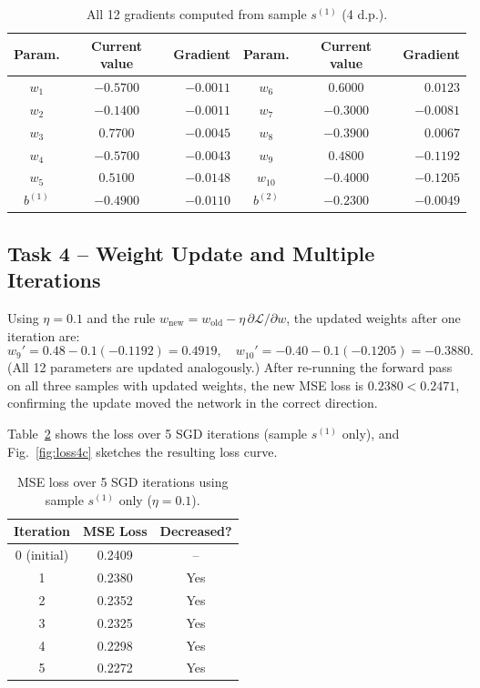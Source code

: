 \documentclass[runningheads]{llncs}
\begin{document}
\begin{table}[h]
\centering
\caption{All 12 gradients computed from sample $s^{(1)}$ (4 d.p.).}
\label{tab:gradients}
\begin{tabular}{ccr|ccr}
\toprule
Param. & Current value & Gradient & Param. & Current value & Gradient\\
\midrule
$w_1$      & $-0.5700$ & $-0.0011$ & $w_6$      & $0.6000$ & $0.0123$\\
$w_2$      & $-0.1400$ & $-0.0011$ & $w_7$      & $-0.3000$ & $-0.0081$\\
$w_3$      & $0.7700$  & $-0.0045$ & $w_8$      & $-0.3900$ & $0.0067$\\
$w_4$      & $-0.5700$ & $-0.0043$ & $w_9$      & $0.4800$ & $-0.1192$\\
$w_5$      & $0.5100$  & $-0.0148$ & $w_{10}$   & $-0.4000$ & $-0.1205$\\
$b^{(1)}$  & $-0.4900$ & $-0.0110$ & $b^{(2)}$  & $-0.2300$ & $-0.0049$\\
\bottomrule
\end{tabular}
\end{table}

\subsection{Task 4 -- Weight Update and Multiple Iterations}

Using $\eta = 0.1$ and the rule $w_{\text{new}} = w_{\text{old}} - \eta\,\partial\mathcal{L}/\partial w$, the updated weights after one iteration are:
\[
  w_9' = 0.48 - 0.1(-0.1192) = 0.4919, \quad
  w_{10}' = -0.40 - 0.1(-0.1205) = -0.3880.
\]
(All 12 parameters are updated analogously.) After re-running the forward pass
on all three samples with updated weights, the new MSE loss is $0.2380 < 0.2471$,
confirming the update moved the network in the correct direction.

Table~\ref{tab:task4c} shows the loss over 5 SGD iterations (sample $s^{(1)}$
only), and Fig.~\ref{fig:loss4c} sketches the resulting loss curve.

\begin{table}[h]
\centering
\caption{MSE loss over 5 SGD iterations using sample $s^{(1)}$ only ($\eta=0.1$).}
\label{tab:task4c}
\begin{tabular}{ccc}
\toprule
Iteration & MSE Loss & Decreased?\\
\midrule
0 (initial) & 0.2409 & --\\
1 & 0.2380 & Yes\\
2 & 0.2352 & Yes\\
3 & 0.2325 & Yes\\
4 & 0.2298 & Yes\\
5 & 0.2272 & Yes\\
\bottomrule
\end{tabular}
\end{table}
\end{document}
